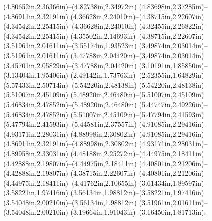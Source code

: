 (4.80652in,2.36366in)--(4.82738in,2.34972in) (4.83698in,2.37285in)--(4.86911in,2.32191in) (4.36628in,2.24010in)--(4.38715in,2.22607in) (4.34542in,2.25415in)--(4.36628in,2.24010in) (4.32455in,2.26822in)--(4.34542in,2.25415in) (4.35502in,2.14693in)--(4.38715in,2.22607in) (3.51961in,2.01611in)--(3.55174in,1.93523in) (3.49874in,2.03014in)--(3.51961in,2.01611in) (3.47788in,2.04420in)--(3.49874in,2.03014in) (3.45701in,2.05829in)--(3.47788in,2.04420in) (3.10191in,1.85850in)--(3.13404in,1.95406in) (2.49142in,1.73763in)--(2.52355in,1.64829in) (5.57433in,2.50714in)--(5.54220in,2.48138in) (5.54220in,2.48138in)--(5.51007in,2.45109in) (5.48920in,2.46480in)--(5.51007in,2.45109in) (5.46834in,2.47852in)--(5.48920in,2.46480in) (5.44747in,2.49226in)--(5.46834in,2.47852in) (5.51007in,2.45109in)--(5.47794in,2.41593in) (5.47794in,2.41593in)--(5.44581in,2.37557in) (4.91085in,2.29416in)--(4.93171in,2.28031in) (4.88998in,2.30802in)--(4.91085in,2.29416in) (4.86911in,2.32191in)--(4.88998in,2.30802in) (4.93171in,2.28031in)--(4.89958in,2.33031in) (4.48188in,2.25272in)--(4.44975in,2.18411in) (4.42888in,2.19807in)--(4.44975in,2.18411in) (4.40801in,2.21206in)--(4.42888in,2.19807in) (4.38715in,2.22607in)--(4.40801in,2.21206in) (4.44975in,2.18411in)--(4.41762in,2.10655in) (3.61434in,1.89597in)--(3.58221in,1.97416in) (3.56134in,1.98812in)--(3.58221in,1.97416in) (3.54048in,2.00210in)--(3.56134in,1.98812in) (3.51961in,2.01611in)--(3.54048in,2.00210in) (3.19664in,1.91043in)--(3.16450in,1.81713in);
